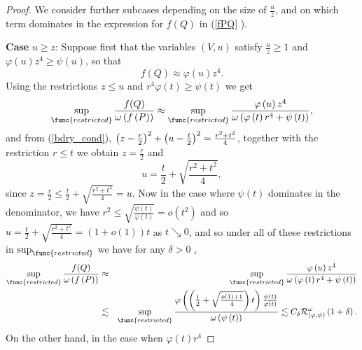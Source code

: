 \documentclass{amsart}
\theoremstyle{plain}
\numberwithin{equation}{section}
\begin{document}
\begin{proof}
We consider further subcases depending on the size of $\frac{u}{z}$, and on
which term dominates in the expression for $f\left( Q\right) $ in (\ref{fPQ}%
).

\textbf{Case }$u\geq z$: Suppose first that the variables $(V,u)$ satisfy $%
\frac{u}{z}\geq 1$ and $\varphi \left( u\right) z^{4}\geq \psi \left(
u\right) $, so that 
\begin{equation*}
f(Q)\approx \varphi \left( u\right) z^{4}.
\end{equation*}%
Using the restrictions $z\leq u$ and $r^{4}\varphi \left( t\right) \geq \psi
\left( t\right) $ we get 
\begin{equation*}
\sup_{\func{restricted}}\frac{f(Q)}{\omega \left( f\left( P\right) \right) }%
\approx \sup_{\func{restricted}}\frac{\varphi \left( u\right) z^{4}}{\omega
\left( \varphi \left( t\right) r^{4}+\psi \left( t\right) \right) },
\end{equation*}%
and from (\ref{bdry_cond}), $\left( z-\frac{r}{2}\right) ^{2}+\left( u-\frac{%
t}{2}\right) ^{2}=\frac{r^{2}+t^{2}}{4}$, together with the restriction $%
r\leq t$ we obtain $z=\frac{r}{2}$ and%
\begin{equation*}
u=\frac{t}{2}+\sqrt{\frac{r^{2}+t^{2}}{4}},
\end{equation*}%
since $z=\frac{r}{2}\leq \frac{t}{2}+\sqrt{\frac{r^{2}+t^{2}}{4}}=u$. Now in
the case where $\psi \left( t\right) $ dominates in the denominator, we have 
$r^{2}\leq \sqrt{\frac{\psi \left( t\right) }{\varphi \left( t\right) }}%
=o\left( t^{2}\right) $ and so $u=\frac{t}{2}+\sqrt{\frac{r^{2}+t^{2}}{4}}%
=\left( 1+o\left( 1\right) \right) t$ as $t\searrow 0$, and so under all of
these restrictions in $\sup_{\func{restricted}}$ we have for any $\delta >0$%
, 
\begin{eqnarray*}
\sup_{\func{restricted}}\frac{f(Q)}{\omega \left( f\left( P\right) \right) }
&\approx &\sup_{\func{restricted}}\frac{\varphi \left( u\right) z^{4}}{%
\omega \left( \varphi \left( t\right) r^{4}+\psi \left( t\right) \right) } \\
&\lesssim &\sup_{\func{restricted}}\frac{\varphi \left( \left( \frac{1}{2}+%
\sqrt{\frac{o\left( 1\right) +1}{4}}\right) t\right) \frac{\psi \left(
t\right) }{\varphi \left( t\right) }}{\omega \left( \psi \left( t\right)
\right) }\lesssim C_{\delta }\mathcal{R}_{\left( \varphi ,\psi \right)
}^{\omega }\left( 1+\delta \right) .
\end{eqnarray*}%
On the other hand, in the case when $\varphi \left( t\right) r^{4}$

\end{proof}
\end{document}

